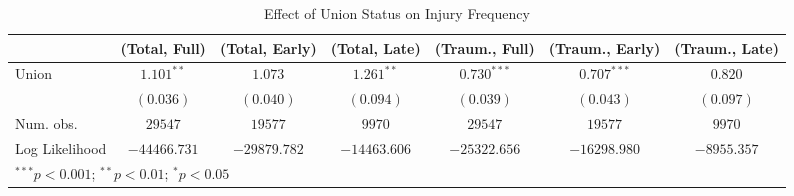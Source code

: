 
\begin{table}[H]
\begin{center}
\begin{tabular}{l c c c c c c}
\hline
 & (Total, Full) & (Total, Early) & (Total, Late) & (Traum., Full) & (Traum., Early) & (Traum., Late) \\
\hline
Union          & $1.101^{**}$ & $1.073$      & $1.261^{**}$ & $0.730^{***}$ & $0.707^{***}$ & $0.820$     \\
               & $(0.036)$    & $(0.040)$    & $(0.094)$    & $(0.039)$     & $(0.043)$     & $(0.097)$   \\
\hline
Num. obs.      & $29547$      & $19577$      & $9970$       & $29547$       & $19577$       & $9970$      \\
Log Likelihood & $-44466.731$ & $-29879.782$ & $-14463.606$ & $-25322.656$  & $-16298.980$  & $-8955.357$ \\
\hline
\multicolumn{7}{l}{\scriptsize{$^{***}p<0.001$; $^{**}p<0.01$; $^{*}p<0.05$}}
\end{tabular}
\caption{Effect of Union Status on Injury Frequency}
\label{irr_100employees_injuries}
\end{center}
\end{table}

